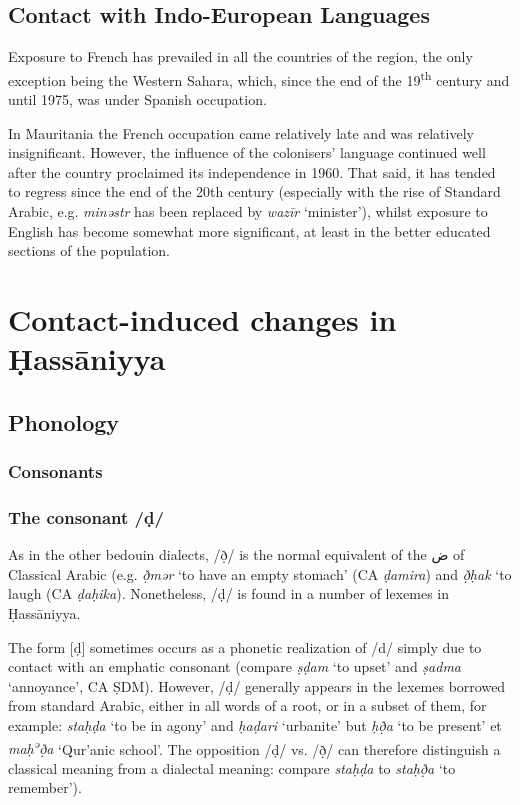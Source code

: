 \documentclass[output=paper]{langsci/langscibook}
\begin{document}
\subsection{ Contact with Indo-European Languages} %

Exposure to French has prevailed in all the countries of the region, the only exception being the Western Sahara, which, since the end of the 19\textsuperscript{th} century and until 1975, was under Spanish occupation.

In Mauritania the French occupation came relatively late and was relatively insignificant. However, the influence of the colonisers’ language continued well after the country proclaimed its independence in 1960. That said, it has tended to regress since the end of the 20th century (especially with the rise of Standard Arabic, e.g. \textit{minəstr} has been replaced by \textit{wazīr} ‘minister’), whilst exposure to English has become somewhat more significant, at least in the better educated sections of the population.

\section{Contact-induced changes in  Ḥassāniyya} %

\subsection{ Phonology} %

\subsubsection{ Consonants} %
\subsubsection{The consonant /ḍ/} %
As in the other bedouin dialects, /ð̣/ is the normal equivalent of the ض of Classical Arabic (e.g. \textit{ð̣mər} ‘to have an empty stomach’ (CA \textit{ḍamira}) and \textit{ð̣ḥak} ‘to laugh (CA \textit{ḍaḥika}). Nonetheless, /ḍ/ is found in a number of lexemes in Ḥassāniyya. 

The form [ḍ] sometimes occurs as a phonetic realization of /d/ simply due to contact with an emphatic consonant (compare \textit{ṣḍam} ‘to upset’ and \textit{ṣadma} ‘annoyance’, CA ṢDM). However, /ḍ/ generally appears in the lexemes borrowed from standard Arabic, either in all words of a root, or in a subset of them, for example: \textit{staḥḍa{\R}} ‘to be in agony’ and \textit{ḥaḍari} ‘urbanite’ but \textit{ḥð̣a{\R}} ‘to be present’ et \textit{maḥ\textsuperscript{ə}}\textit{ð̣{\R}a} ‘Qur’anic school’. The opposition /ḍ/ vs. /ð̣/ can therefore distinguish a classical meaning from a dialectal meaning: compare \textit{staḥḍa{\R}} to \textit{staḥð̣a{\R}} ‘to remember’).
\end{document}
